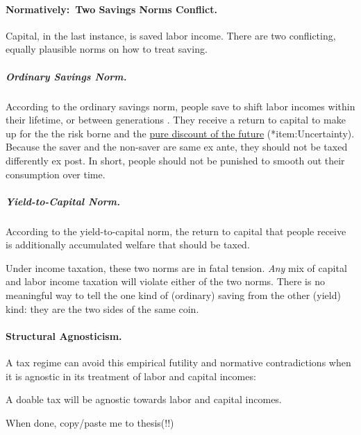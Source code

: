 \paragraph{Normatively:~Two Savings Norms Conflict.}  \label{sec:TwoSavingsNorms} Capital, in the last instance, is saved labor income.
There are two conflicting, equally plausible norms on how to treat saving.

\subparagraph{Ordinary Savings Norm.}  \label{sec:OSN} According to the ordinary savings norm, people save to shift labor incomes within their lifetime, or between generations \citep[819]{McCaffery2005}.
They receive a return to capital to make up for the the risk borne and the \hyperref[item:Uncertainty]{pure discount of the future} (*{item:Uncertainty}).
Because the saver and the non-saver are same ex ante, they should not be taxed differently ex post.
In short, people should not be punished to smooth out their consumption over time.

\subparagraph{Yield-to-Capital Norm.}  \label{sec:Y2C} According to the yield-to-capital norm, the return to capital that people receive is additionally accumulated welfare that should be taxed.

Under income taxation, these two norms are in fatal tension.
\emph{Any} mix of capital and labor income taxation will violate either of the two norms.
There is no meaningful way to tell the one kind of (ordinary) saving from the other (yield) kind:
they are the two sides of the same coin.


\paragraph{Structural Agnosticism.} A tax regime can avoid this empirical futility and normative contradictions when it is agnostic in its treatment of labor and capital incomes:

\begin{desideratum}
	A doable tax will be agnostic towards labor and capital incomes.
	\label{des:structural-agnosticism}
\end{desideratum}

When done, copy/paste me to thesis(!!)
